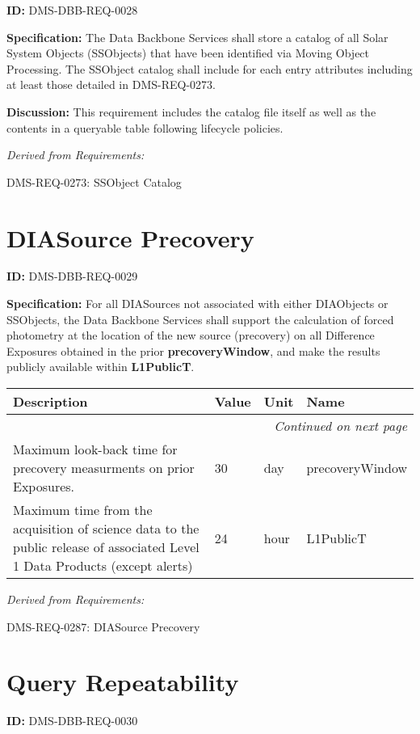 \documentclass[SE,toc,lsstdraft]{lsstdoc}
\makeatletter
\newcommand{\paramname}[1]{\hspace{0pt}#1}
\newcommand{\unitname}[1]{\hspace{0pt}#1}
\newenvironment{parameters}[0]{%
\setlength\LTleft{0pt}
\setlength\LTright{\fill}
\begin{small}
\begin{longtable}[]{|p{0.49\textwidth}|l|p{0.6in}|p{1.70in}@{}|}

\hline \textbf{Description} & \textbf{Value} & \textbf{Unit} & \textbf{Name} \\ \hline
\endhead

\hline \multicolumn{4}{r}{\emph{Continued on next page}} \\
\endfoot

\hline\hline
\endlastfoot
}{%
\hline
\end{longtable}
\end{small}
}
\makeatother
\begin{document}
\label{DMS-DBB-REQ-0028}
\textbf{ID:} DMS-DBB-REQ-0028

\textbf{Specification:}
The Data Backbone Services shall store a catalog of all Solar System Objects (SSObjects) that have been identified via Moving Object Processing. The SSObject catalog shall include for each entry attributes including at least those detailed in DMS-REQ-0273.

\textbf{Discussion:}
This requirement includes the catalog file itself as well as the contents in a queryable table following lifecycle policies.

\emph{Derived from Requirements:}

DMS-REQ-0273:
SSObject Catalog \newline

\section{DIASource Precovery}

\label{DMS-DBB-REQ-0029}
\textbf{ID:} DMS-DBB-REQ-0029

\textbf{Specification:}
For all DIASources not associated with either DIAObjects or SSObjects, the Data Backbone Services shall support the calculation of forced photometry at the location of the new source (precovery) on all Difference Exposures obtained in the prior \textbf{precoveryWindow}, and make the results publicly available within \textbf{L1PublicT}.

\begin{parameters}
Maximum look-back time for precovery measurments on prior Exposures.
&
30
&
\unitname{%
day
}
&
\paramname{%
precoveryWindow
} \\\hline
Maximum time from the acquisition of science data to the public release of associated Level 1 Data Products (except alerts)
&
24
&
\unitname{%
hour
}
&
\paramname{%
L1PublicT
} \\\hline
\end{parameters}

\emph{Derived from Requirements:}

DMS-REQ-0287:
DIASource Precovery \newline

\section{Query Repeatability}

\label{DMS-DBB-REQ-0030}
\textbf{ID:} DMS-DBB-REQ-0030
\end{document}
